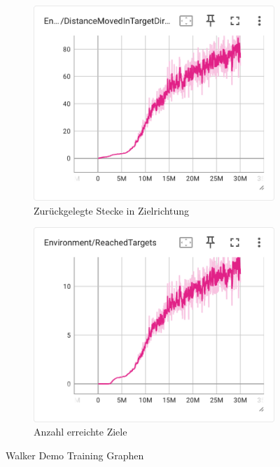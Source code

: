 \begin{figure}[H]
    \begin{subfigure}{.49\textwidth}
      \centering  
      \includegraphics[width=\textwidth]{img/116_move_target_dir}
      \caption{Zurückgelegte Stecke in Zielrichtung}
      \label{fig:116_move_target_dir}
    \end{subfigure}
    \begin{subfigure}{.49\textwidth}
      \centering  
      \includegraphics[width=\textwidth]{img/116_reach_target}
      \caption{Anzahl erreichte Ziele}
      \label{fig:116_reach_target}
    \end{subfigure}
    \caption{Walker Demo Training Graphen}
      \label{fig:116_training_graph}
\end{figure}

